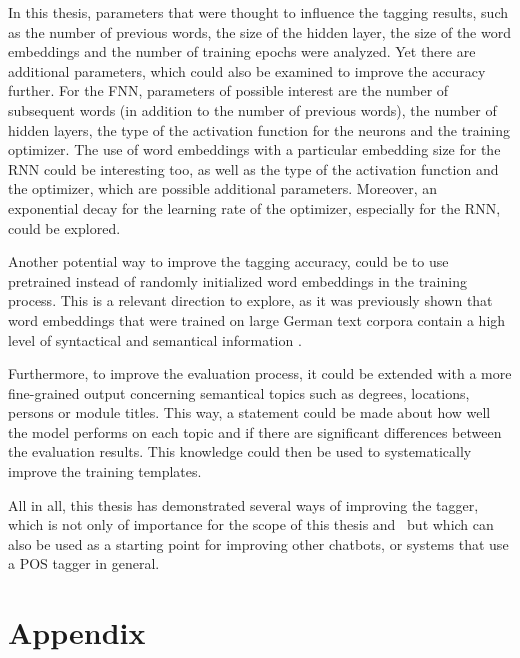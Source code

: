 In this thesis, parameters that were thought to influence the tagging results, such as the number of previous words, the size of the hidden layer, the size of the word embeddings and the number of training epochs were analyzed. Yet there are additional parameters, which could also be examined to improve the accuracy further. For the FNN, parameters of possible interest are the number of subsequent words (in addition to the number of previous words), the number of hidden layers, the type of the activation function for the neurons and the training optimizer. The use of word embeddings with a particular embedding size for the RNN could be interesting too, as well as the type of the activation function and the optimizer, which are possible additional parameters. Moreover, an exponential decay for the learning rate of the optimizer, especially for the RNN, could be explored.

Another potential way to improve the tagging accuracy, could be to use pretrained instead of randomly initialized word embeddings in the training process. This is a relevant direction to explore, as it was previously shown that word embeddings that were trained on large German text corpora contain a high level of syntactical and semantical information \cite{mueller2015}.

Furthermore, to improve the evaluation process, it could be extended with a more fine-grained output concerning semantical topics such as degrees, locations, persons or module titles. This way, a statement could be made about how well the model performs on each topic and if there are significant differences between the evaluation results. This knowledge could then be used to systematically improve the training templates.

All in all, this thesis has demonstrated several ways of improving the tagger, which is not only of importance for the scope of this thesis and \Alex\ but which can also be used as a starting point for improving other chatbots, or systems that use a POS tagger in general.




\appendix
\chapter{Appendix}\label{c.appendix}

